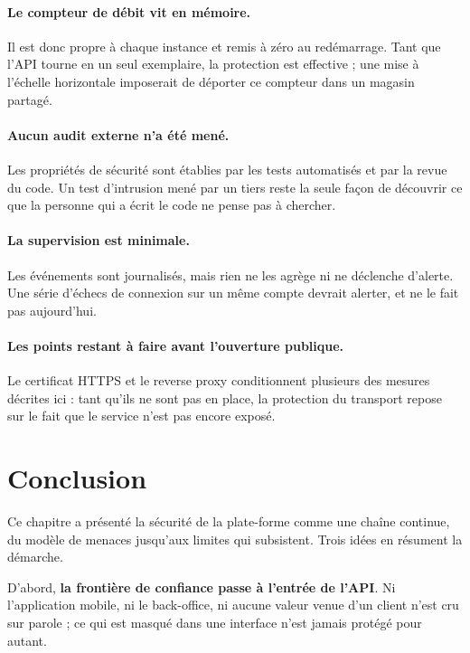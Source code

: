 \paragraph{Le compteur de débit vit en mémoire.} Il est donc propre à chaque
instance et remis à zéro au redémarrage. Tant que l'API tourne en un seul
exemplaire, la protection est effective ; une mise à l'échelle horizontale
imposerait de déporter ce compteur dans un magasin partagé.

\paragraph{Aucun audit externe n'a été mené.} Les propriétés de sécurité sont
établies par les tests automatisés et par la revue du code. Un test
d'intrusion mené par un tiers reste la seule façon de découvrir ce que la
personne qui a écrit le code ne pense pas à chercher.

\paragraph{La supervision est minimale.} Les événements sont journalisés, mais
rien ne les agrège ni ne déclenche d'alerte. Une série d'échecs de connexion
sur un même compte devrait alerter, et ne le fait pas aujourd'hui.

\paragraph{Les points restant à faire avant l'ouverture publique.} Le
certificat HTTPS et le reverse proxy conditionnent plusieurs des mesures
décrites ici : tant qu'ils ne sont pas en place, la protection du transport
repose sur le fait que le service n'est pas encore exposé.

\section*{Conclusion}

Ce chapitre a présenté la sécurité de la plate-forme comme une chaîne
continue, du modèle de menaces jusqu'aux limites qui subsistent. Trois idées
en résument la démarche.

D'abord, \textbf{la frontière de confiance passe à l'entrée de l'API}. Ni
l'application mobile, ni le back-office, ni aucune valeur venue d'un client
n'est cru sur parole ; ce qui est masqué dans une interface n'est jamais
protégé pour autant.

